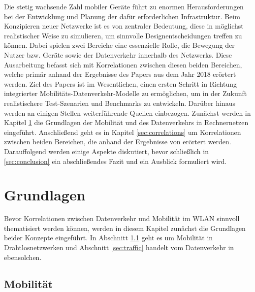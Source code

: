 \documentclass[12pt, a4paper]{article}
\begin{document}
Die stetig wachsende Zahl mobiler Geräte führt zu enormen Herausforderungen bei der Entwicklung
und Planung der dafür erforderlichen Infrastruktur. Beim Konzipieren neuer Netzwerke ist es von zentraler
Bedeutung, diese in möglichst realistischer Weise zu simulieren, um sinnvolle Designentscheidungen
treffen zu können. Dabei spielen zwei Bereiche eine essenzielle Rolle, die Bewegung der Nutzer bzw. Geräte
sowie der Datenverkehr innerhalb des Netzwerks.\newline
Diese Ausarbeitung befasst sich mit Korrelationen zwischen diesen beiden Bereichen,
welche primär anhand der Ergebnisse des Papers  \cite{Alipour2018} aus dem Jahr 2018 erörtert werden.
Ziel des Papers ist im Wesentlichen, einen ersten Schritt in Richtung integrierter Mobilitäts-Datenverkehr-Modelle 
zu ermöglichen, um in der Zukunft realistischere Test-Szenarien und Benchmarks zu entwickeln.
Darüber hinaus werden an einigen Stellen weiterführende Quellen einbezogen.
\newline\newline
Zunächst werden in Kapitel \ref{sec:basics} die Grundlagen der Mobilität und des Datenverkehrs in Rechnernetzen
eingeführt. Anschließend geht es in Kapitel \ref{sec:correlations} um Korrelationen zwischen beiden
Bereichen, die anhand der Ergebnisse von \cite{Alipour2018} erörtert werden.
Darauffolgend werden einige Aspekte diskutiert, bevor schließlich in \ref{sec:conclusion} ein abschließendes
Fazit und ein Ausblick formuliert wird.

\section{Grundlagen}
\label{sec:basics}

Bevor Korrelationen zwischen Datenverkehr und Mobilität im WLAN sinnvoll thematisiert werden können, 
werden in diesem Kapitel zunächst die Grundlagen beider Konzepte eingeführt.
In Abschnitt \ref{sec:mobility} geht es um Mobilität in Drahtlosnetzwerken und Abschnitt \ref{sec:traffic} handelt
vom Datenverkehr in ebensolchen.

\subsection{Mobilität}
\label{sec:mobility}
\end{document}
